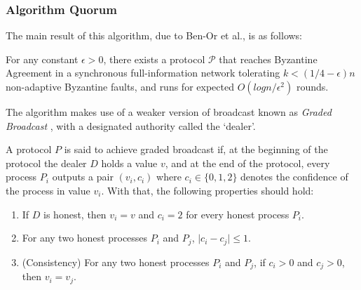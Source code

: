 \subsubsection{Algorithm Quorum\cite{BPV06}}
The main result of this algorithm, due to Ben-Or et al., is as follows:
\begin{theorem}
For any constant $\epsilon > 0$, there exists a protocol $\mathcal{P}$ that reaches Byzantine Agreement in a synchronous full-information network tolerating $k < (1/4 - \epsilon) n$ non-adaptive Byzantine faults, and runs for expected $O(logn/\epsilon^2)$ rounds. 
\end{theorem}
The algorithm makes use of a weaker version of broadcast known as \textit{Graded Broadcast} \cite{FM97}, with a designated authority called the `dealer'.
\begin{definition}
A protocol $P$ is said to achieve graded broadcast if, at the beginning of the protocol the dealer $D$ holds a value $v$, and at the end of the protocol, every process $P_i$ outputs a pair $(v_i, c_i)$ where $c_i \in \{0, 1, 2\}$ denotes the confidence of the process in value $v_i$. With that, the following properties should hold:
\begin{enumerate}
\item If $D$ is honest, then $v_i = v$ and $c_i = 2$ for every honest process $P_i$. 
\item For any two honest processes $P_i$ and $P_j$, $\mid c_i - c_j \mid \leq 1$.
\item (Consistency) For any two honest processes $P_i$ and $P_j$, if $c_i > 0$ and $c_j > 0$, then $v_i = v_j$.
\end{enumerate}
\end{definition}

